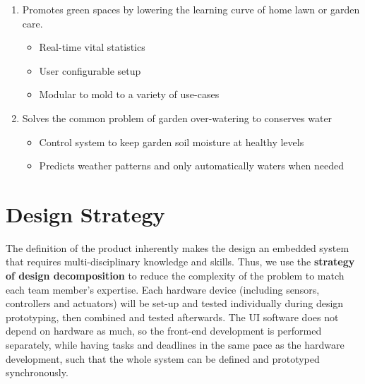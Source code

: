 \documentclass{report}
\begin{document}
\begin{enumerate}[label=\alph*.]
    \item
          Promotes green spaces by lowering the learning curve of home lawn or garden care.
          \begin{itemize}
              \item
                    Real-time vital statistics
              \item
                    User configurable setup
              \item
                    Modular to mold to a variety of use-cases
          \end{itemize}
    \item
          Solves the common problem of garden over-watering to conserves water
          \begin{itemize}
              \item
                    Control system to keep garden soil moisture at healthy levels
              \item
                    Predicts weather patterns and only automatically waters when needed
          \end{itemize}
\end{enumerate}


\section{Design Strategy}
The definition of the product inherently makes the design an embedded system that requires multi-disciplinary knowledge and skills. Thus, we use the \textbf{strategy of design decomposition} to reduce the complexity of the problem to match each team member's expertise. Each hardware device (including sensors, controllers and actuators) will be set-up and tested individually during design prototyping, then combined and tested afterwards. The UI software does not depend on hardware as much, so the front-end development is performed separately, while having tasks and deadlines in the same pace as the hardware development, such that the whole system can be defined and prototyped synchronously. \\
\end{document}
